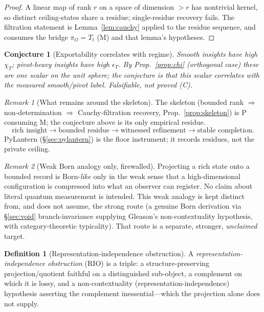 \documentclass[11pt]{article}
\newtheorem*{conjecture}{Conjecture}
\theoremstyle{definition}
\newtheorem{definition}{Definition}
\theoremstyle{remark}
\newtheorem*{remark}{Remark}
\begin{document}
\begin{proof}
A linear map of rank $r$ on a space of dimension $>r$ has nontrivial kernel, so distinct
ceiling-states share a residue; single-residue recovery fails. The filtration statement is
Lemma~\ref{lem:cauchy} applied to the residue sequence, and consumes the bridge $\pi_O=T_t$ (M) and
that lemma's hypotheses.
\end{proof}

\begin{conjecture}[Exportability correlates with regime]
Smooth insights have high $\chi_T$; pivot-heavy insights have high $\epsilon_T$. By
Prop.~\ref{prop:chi} (orthogonal case) these are one scalar on the unit sphere; the conjecture is
that this scalar correlates with the measured smooth/pivot label. Falsifiable, not proved (C).
\end{conjecture}

\begin{remark}[What remains around the skeleton]
The skeleton (bounded rank $\Rightarrow$ non-determination $\Rightarrow$ Cauchy-filtration
recovery, Prop.~\ref{prop:skeleton}) is P consuming M; the conjecture above is its only empirical
residue.
\[
  \text{rich insight} \to \text{bounded residue} \to \text{witnessed refinement} \to \text{stable completion}.
\]
PyLantern (\S\ref{sec:pylantern}) is the floor instrument; it records residues, not the private
ceiling.
\end{remark}

\begin{remark}[Weak Born analogy only, firewalled]
Projecting a rich state onto a bounded record is Born-\emph{like} only in the weak sense that a
high-dimensional configuration is compressed into what an observer can register. No claim about literal
quantum measurement is intended. This weak analogy is kept distinct from, and does not assume, the
strong route (a genuine Born derivation via \S\ref{sec:void} branch-invariance supplying Gleason's
non-contextuality hypothesis, with category-theoretic typicality). That route is a separate, stronger,
\emph{unclaimed} target.
\end{remark}

\begin{definition}[Representation-independence obstruction]\label{def:rio}
A \emph{representation-independence obstruction} (RIO) is a triple: a structure-preserving
projection/quotient faithful on a distinguished sub-object, a complement on which it is lossy, and a
non-contextuality (representation-independence) hypothesis asserting the complement
inessential---which the projection alone does not supply.
\end{definition}
\end{document}
